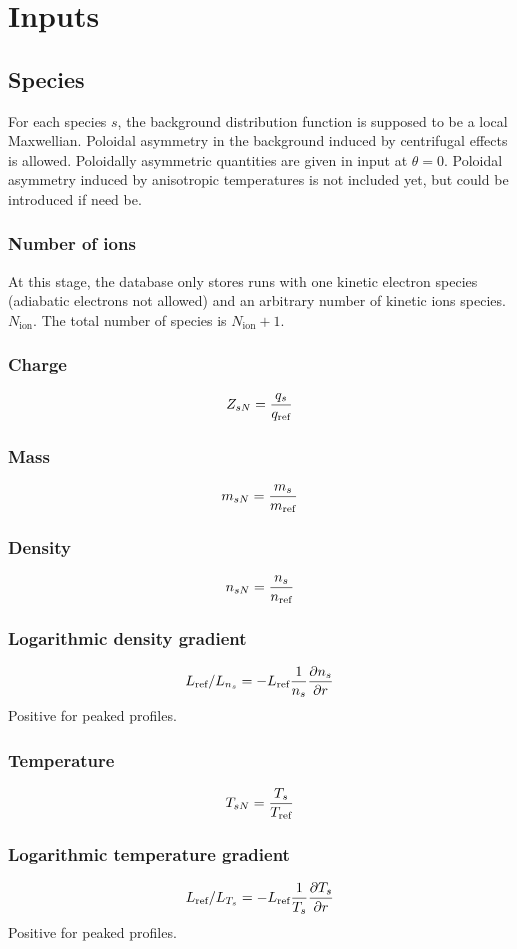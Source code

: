 \documentclass[fleqn]{report}
\begin{document}
\chapter{Inputs}
\section{Species}
For each species $s$, the background distribution function is supposed to be a local Maxwellian. Poloidal asymmetry in the background induced by centrifugal effects is allowed. Poloidally asymmetric quantities are given in input at $\theta=0$. Poloidal asymmetry induced by anisotropic temperatures is not included yet, but could be introduced if need be. 
\subsection{Number of ions}
At this stage, the database only stores runs with one kinetic electron species (adiabatic electrons not allowed) and an arbitrary number of kinetic ions species. $N_\textrm{ion}$. The total number of species is  $N_\textrm{ion}+1$.

\subsection{Charge}
$$Z_{sN}=\frac{q_s}{q_{\textrm{ref}}}$$
\subsection{Mass}
$$m_{sN}=\frac{m_s}{m_{\textrm{ref}}}$$
\subsection{Density}
$$n_{sN}=\frac{n_s}{n_{\textrm{ref}}}$$
\subsection{Logarithmic density gradient}
$$L_{\textrm{ref}}/L_{n_s}=-L_{\textrm{ref}} \frac{1}{n_s}\frac{\partial n_s}{\partial r}$$
Positive for peaked profiles. 
\subsection{Temperature}
$$T_{sN}=\frac{T_s}{T_{\textrm{ref}}}$$
\subsection{Logarithmic temperature gradient}
$$L_{\textrm{ref}}/L_{T_s}=-L_{\textrm{ref}} \frac{1}{T_s}\frac{\partial T_s}{\partial r}$$
Positive for peaked profiles.
\end{document}

